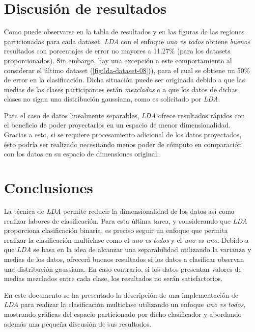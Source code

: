 \documentclass[journal]{IEEEtran}
\begin{document}
\section{Discusión de resultados}
\label{sec:discusion}
Como puede observarse en la tabla de resultados y en las figuras de las regiones particionadas para cada dataset, \emph{LDA} con el enfoque \emph{uno vs todos} obtiene \emph{buenos} resultados con porcentajes de error no mayores a 11.27\% (para los datasets proporcionados).
Sin embargo, hay una excepción a este comportamiento al considerar el último dataset (\ref{fig:lda-dataset-08})), para el cual se obtiene un 50\% de error en la clasificación.
Dicha situación puede ser originada debido a que las medias de las clases participantes están \emph{mezcladas} o a que los datos de dichas clases no sigan una distribución gaussiana, como es solicitado por \emph{LDA}.

Para el caso de datos linealmente separables, \emph{LDA} ofrece resultados rápidos con el beneficio de poder proyectarlos en un espacio de menor dimensionalidad.
Gracias a esto, si se requiere procesamiento adicional de los datos proyectados, ésto podría ser realizado necesitando menos poder de cómputo en comparación con los datos en su espacio de dimensiones original.

\section{Conclusiones}
\label{sec:conclusiones}
La técnica de \emph{LDA} permite reducir la dimensionalidad de los datos así como realizar labores de clasificación.
Para esta última tarea, y considerando que \emph{LDA} proporciona clasificación binaria, es preciso seguir un enfoque que permita realizar la clasificación multiclase como el \emph{uno vs todos} y el \emph{uno vs uno}.
Debido a que \emph{LDA} se basa en la idea de alcanzar una separabilidad utilizando la varianza y medias de los datos, ofrecerá buenos resultados si los datos a clasificar observan una distribución gaussiana.
En caso contrario, si los datos presentan valores de medias mezclados entre cada clase, los resultados no serán satisfactorios.

En este documento se ha presentado la descripción de una implementación de \emph{LDA} para realizar la clasificación multiclase utilizando un enfoque \emph{uno vs todos}, mostrando gráficas del espacio particionado por dicho clasificador y abordando además una pequeña discusión de sus resultados.

\nocite{*}


\end{document}
